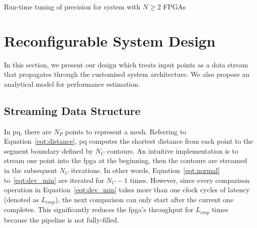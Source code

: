 \begin{algorithm}[ht]
\caption{Run-time tuning of precision for system with $N \geq 2$ FPGAs}
\begin{algorithmic}[1]
\REPEAT
\end{algorithmic}
\label{algo:reconfig}
\end{algorithm}



\section{Reconfigurable System Design}
\label{sec:precision_implementation}

In this section, we present our design which treats input points as a data stream that propagates through the customised system architecture.
We also propose an analytical model for performance estimation.

\subsection{Streaming Data Structure}
In \gls{pq}, there are $N_P$ points to represent a mesh.
Referring to Equation~\ref{eqt:distance}, \gls{pq} computes the shortest distance from each point to the segment boundary defined by $N_C$ contours.
An intuitive implementation is to stream one point into the \gls{fpga} at the beginning,
then the contours are streamed in the subsequent $N_C$ iterations.
In other words, Equation~\ref{eqt:normal} to~\ref{eqt:dev_min} are iterated for $N_C-1$ times.
However, since every comparison operation in Equation~\ref{eqt:dev_min} takes more than one clock cycles of latency (denoted as $L_{cmp}$), the next comparison can only start after the current one completes. 
This significantly reduces the \gls{fpga}'s throughput for $L_{cmp}$ times because the pipeline is not fully-filled.

